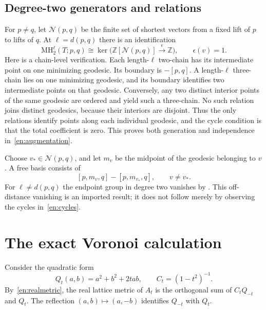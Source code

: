 \documentclass[12pt]{amsart}
\theoremstyle{definition}
\theoremstyle{remark}
\numberwithin{equation}{section}
\newcommand{\Z}{\mathbb{Z}}
\newcommand{\MH}{\mathrm{MH}}
\begin{document}
\subsection{Degree-two generators and relations}
For $p\ne q$, let $\mathcal N(p,q)$ be the finite set of shortest vectors from a fixed lift of $p$ to lifts of $q$. At $\ell=d(p,q)$ there is an identification
\begin{equation}\label{en:augmentation}
\MH_2^\ell(T;p,q)\cong
\ker\bigl(\Z[\mathcal N(p,q)]\xrightarrow{\epsilon}\Z\bigr),
\qquad \epsilon(v)=1.
\end{equation}
Here is a chain-level verification. Each length-$\ell$ two-chain has its intermediate point on one minimizing geodesic. Its boundary is $-[p,q]$. A length-$\ell$ three-chain lies on one minimizing geodesic, and its boundary identifies two intermediate points on that geodesic. Conversely, any two distinct interior points of the same geodesic are ordered and yield such a three-chain. No such relation joins distinct geodesics, because their interiors are disjoint. Thus the only relations identify points along each individual geodesic, and the cycle condition is that the total coefficient is zero. This proves both generation and independence in~\eqref{en:augmentation}.

Choose $v_*\in\mathcal N(p,q)$, and let $m_v$ be the midpoint of the geodesic belonging to $v$. A free basis consists of
\begin{equation}\label{en:cycles}
[p,m_v,q]-[p,m_{v_*},q],\qquad v\ne v_*.
\end{equation}
For $\ell\ne d(p,q)$ the endpoint group in degree two vanishes by \cite[Corollary 3.15]{en:G}. This off-distance vanishing is an imported result; it does not follow merely by observing the cycles in~\eqref{en:cycles}.

\section{The exact Voronoi calculation}
Consider the quadratic form
\begin{equation}\label{en:quad}
Q_t(a,b)=a^2+b^2+2tab,
\qquad C_t=(1-t^2)^{-1}.
\end{equation}
By~\eqref{en:realmetric}, the real lattice metric of $A_t$ is the orthogonal sum of $C_tQ_{-t}$ and $Q_t$. The reflection $(a,b)\mapsto(a,-b)$ identifies $Q_{-t}$ with $Q_t$.
\end{document}
